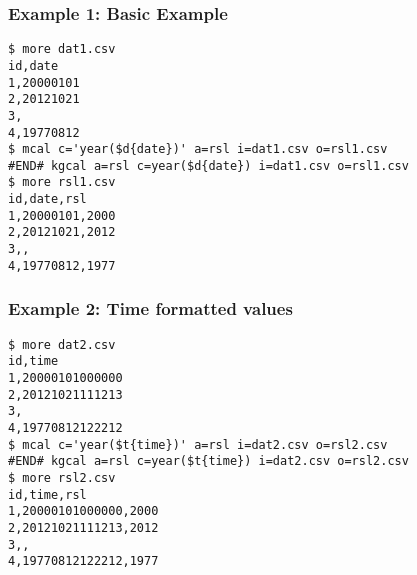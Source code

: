 \subsubsection*{Example 1: Basic Example}



\begin{Verbatim}[baselinestretch=0.7,frame=single]
$ more dat1.csv
id,date
1,20000101
2,20121021
3,
4,19770812
$ mcal c='year($d{date})' a=rsl i=dat1.csv o=rsl1.csv
#END# kgcal a=rsl c=year($d{date}) i=dat1.csv o=rsl1.csv
$ more rsl1.csv
id,date,rsl
1,20000101,2000
2,20121021,2012
3,,
4,19770812,1977
\end{Verbatim}
\subsubsection*{Example 2: Time formatted values}



\begin{Verbatim}[baselinestretch=0.7,frame=single]
$ more dat2.csv
id,time
1,20000101000000
2,20121021111213
3,
4,19770812122212
$ mcal c='year($t{time})' a=rsl i=dat2.csv o=rsl2.csv
#END# kgcal a=rsl c=year($t{time}) i=dat2.csv o=rsl2.csv
$ more rsl2.csv
id,time,rsl
1,20000101000000,2000
2,20121021111213,2012
3,,
4,19770812122212,1977
\end{Verbatim}
